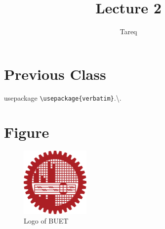 \documentclass{article}
\title{Lecture 2}
\author{Tareq}
\begin{document}
\maketitle

\section{Previous Class}

usepackage \verb|\usepackage{verbatim}|.\textbackslash.

\section{Figure}

\begin{figure}[h]
	\centering
	\includegraphics[width=0.3\textwidth]{buetlogo.png}
	\caption{Logo of BUET}
	\label{fig:buetlogo}
\end{figure}
\end{document}

